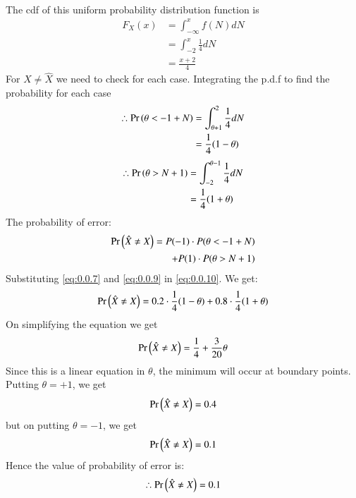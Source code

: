 \documentclass[journal,12pt,twocolumn]{IEEEtran}
\begin{document}
\\
The cdf of this uniform probability distribution function is
\begin{align}
    F_X(x) &= \int_{-\infty}^xf(N)dN\\
    &=\int_{-2}^x\frac{1}{4}dN\\
    &=\frac{x+2}{4}
\end{align}
For $X \neq \hat{X}$ we need to check for each case. Integrating the p.d.f to find the probability for each case
\begin{align}
\therefore
    \Pr\left(\theta < -1 + N\right) &= \int_{\theta + 1}^2 \frac{1}{4}dN\\
    &= \frac{1}{4}(1-\theta)\label{eq:0.0.7}
\end{align}
\begin{align}
\therefore
    \Pr\left(\theta> N + 1\right) &= \int_{-2}^{\theta -1} \frac{1}{4}dN\\
    &= \frac{1}{4}(1+\theta)\label{eq:0.0.9}
\end{align}
The probability of error:
\begin{align}
\nonumber
    \Pr\left(\hat{X} \neq X\right) = P(-1)\cdot {P(\theta < -1 + N)} \\ 
            \quad+ P(1)\cdot {P(\theta> N + 1)}\label{eq:0.0.10}
\end{align}
Substituting \eqref{eq:0.0.7} and \eqref{eq:0.0.9} in \eqref{eq:0.0.10}. We get:
\begin{align}
    \Pr\left(\hat{X} \neq X\right) = 0.2\cdot \frac{1}{4}(1-\theta) + 0.8\cdot \frac{1}{4}(1+\theta)
\end{align}
On simplifying the equation we get
\begin{align}
    \Pr\left(\hat{X} \neq X\right) = \frac{1}{4} + \frac{3}{20}\theta
\end{align}
Since this is a linear equation in $\theta$, the minimum will occur at boundary points.
Putting $\theta = +1$, we get
\begin{align}
    \Pr\left(\hat{X} \neq X\right) = 0.4
\end{align}
but on putting $\theta = -1$, we get
\begin{align}
    \Pr\left(\hat{X} \neq X\right) = 0.1
\end{align}
Hence the value of probability of error is:
\begin{align}
    \therefore \Pr\left(\hat{X} \neq X\right) = 0.1
\end{align}
\end{document}
